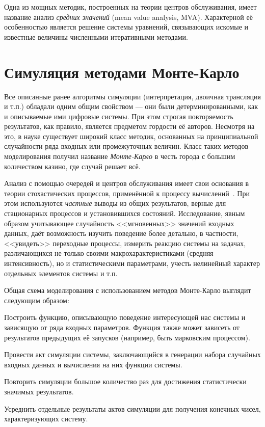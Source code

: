 Одна из мощных методик, построенных на теории центров обслуживания, имеет название анализ \textit{средних значений} (\abbr mean value analysis, MVA). Характерной её особенностью является решение системы уравнений, связывающих искомые и известные величины численными итеративными методами.

\section{Симуляция методами Монте-Карло}

Все описанные ранее алгоритмы симуляции (интерпретация, двоичная трансляция и т.п.) обладали одним общим свойством — они были детерминированными, как и описываемые ими цифровые системы. При этом строгая повторяемость результатов,  как правило, является предметом гордости её авторов. Несмотря на это, в науке существует широкий класс методик, основанных на принципиальной случайности ряда входных или промежуточных величин. Класс таких методов моделирования получил название \textit{Монте-Карло} в честь города с большим количеством казино, где случай решает всё.

Анализ с помощью очередей и центров обслуживания имеет свои основания в теории стохастических процессов, применённой к процессу вычислений~\cite{allen1990}. При этом используются \emph{частные} выводы из общих результатов, верные для стационарных процессов и установившихся состояний. Исследование, явным образом учитывающее случайность <<мгновенных>> значений входных данных, даёт возможность изучить поведение более детально, в частности, <<увидеть>> переходные процессы, измерить реакцию системы на задачах, различающихся не только своими макрохарактеристиками (средняя интенсивность), но и статистическими параметрами, учесть нелинейный характер отдельных элементов системы и т.п.
 
Общая схема моделирования с использованием методов Монте-Карло выглядит следующим образом:

\begin{enumerate*}
\item Построить функцию, описывающую поведение интересующей нас системы и зависящую от ряда входных параметров. Функция также может зависеть от результатов предыдущих её запусков (например, быть марковским процессом).

\item Провести акт симуляции системы, заключающийся в генерации набора случайных входных данных и вычисления на них функции системы.

\item Повторить симуляции большое количество раз для достижения статистически значимых результатов.

\item Усреднить отдельные результаты актов симуляции для получения конечных чисел, характеризующих систему.
\end{enumerate*}

